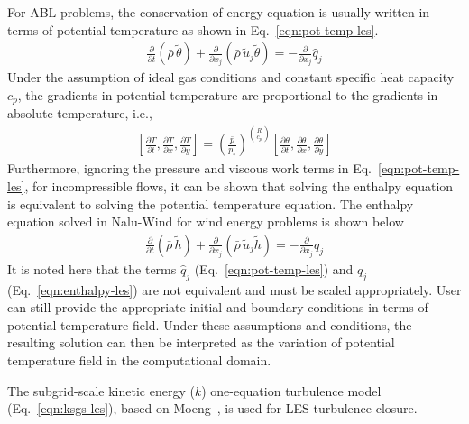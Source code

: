 For ABL problems, the conservation of energy equation is usually written in
terms of potential temperature as shown in Eq.~\ref{eqn:pot-temp-les}.
\begin{align}
  \frac{\partial}{\partial t} \left(\bar{\rho}\, \widetilde{\theta}\right) +
  \frac{\partial}{\partial x_j} \left(\bar{\rho}\, \widetilde{u}_j \widetilde{\theta} \right) = - \frac{\partial}{\partial x_j} \hat{q}_j \label{eqn:pot-temp-les}
\end{align}
Under the assumption of ideal gas conditions and constant specific heat capacity
$c_p$, the gradients in potential temperature are proportional to the gradients
in absolute temperature, i.e.,
\begin{align*}
   \left[ \frac{\partial T}{\partial t}, \frac{\partial T}{\partial x}, \frac{\partial T}{\partial y} \right] =
   \left( \frac{\bar{p}}{p_\circ} \right)^{\left(\frac{R}{c_p}\right)} \left[ \frac{\partial \theta}{\partial t}, \frac{\partial \theta}{\partial x}, \frac{\partial \theta}{\partial y} \right]
\end{align*}
Furthermore, ignoring the pressure and viscous work terms in
Eq.~\ref{eqn:pot-temp-les}, for incompressible flows, it can be shown that
solving the enthalpy equation is equivalent to solving the potential temperature
equation. The enthalpy equation solved in Nalu-Wind for wind energy problems is
shown below
\begin{align}
  \frac{\partial}{\partial t} \left(\bar{\rho}\, \widetilde{h}\right) +
  \frac{\partial}{\partial x_j} \left(\bar{\rho}\, \widetilde{u}_j \widetilde{h} \right) = - \frac{\partial}{\partial x_j} q_j \label{eqn:enthalpy-les}
\end{align}
It is noted here that the terms $\hat{q}_j$ (Eq.~\ref{eqn:pot-temp-les}) and
$q_j$ (Eq.~\ref{eqn:enthalpy-les}) are not equivalent and must be scaled
appropriately. User can still provide the appropriate initial and boundary
conditions in terms of potential temperature field. Under these assumptions and
conditions, the resulting solution can then be interpreted as the variation of
potential temperature field in the computational domain.

The subgrid-scale kinetic energy ($k$) one-equation turbulence model
(Eq.~\ref{eqn:ksgs-les}), based on Moeng~\cite{Moeng1984}, is used for
LES turbulence closure.

